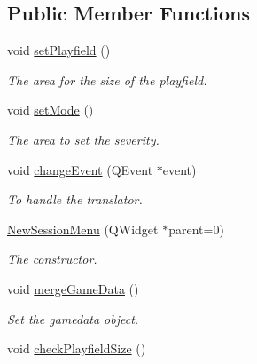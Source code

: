 \subsection*{Public Member Functions}
\begin{DoxyCompactItemize}
\item 
\hypertarget{classNewSessionMenu_a4742167534b8efad3a8163ac3d243b1b}{void \hyperlink{classNewSessionMenu_a4742167534b8efad3a8163ac3d243b1b}{set\-Playfield} ()}\label{classNewSessionMenu_a4742167534b8efad3a8163ac3d243b1b}

\begin{DoxyCompactList}\small\item\em The area for the size of the playfield. \end{DoxyCompactList}\item 
\hypertarget{classNewSessionMenu_afae85196d39cd5b68e445659faf3f901}{void \hyperlink{classNewSessionMenu_afae85196d39cd5b68e445659faf3f901}{set\-Mode} ()}\label{classNewSessionMenu_afae85196d39cd5b68e445659faf3f901}

\begin{DoxyCompactList}\small\item\em The area to set the severity. \end{DoxyCompactList}\item 
void \hyperlink{classNewSessionMenu_abe4916445e5ce3edfe78adb89533f230}{change\-Event} (Q\-Event $\ast$event)
\begin{DoxyCompactList}\small\item\em To handle the translator. \end{DoxyCompactList}\item 
\hyperlink{classNewSessionMenu_ae1038e3894d95dd28e7e9bde54fdc5eb}{New\-Session\-Menu} (Q\-Widget $\ast$parent=0)
\begin{DoxyCompactList}\small\item\em The constructor. \end{DoxyCompactList}\item 
void \hyperlink{classNewSessionMenu_a3a5d3b6d5f3039c7ff2e4933bde10a70}{merge\-Game\-Data} ()
\begin{DoxyCompactList}\small\item\em Set the gamedata object. \end{DoxyCompactList}\item 
\hypertarget{classNewSessionMenu_a51512ad474fdb0eb6b880d17a5ce4d11}{void \hyperlink{classNewSessionMenu_a51512ad474fdb0eb6b880d17a5ce4d11}{check\-Playfield\-Size} ()}\label{classNewSessionMenu_a51512ad474fdb0eb6b880d17a5ce4d11}


\end{DoxyCompactItemize}
